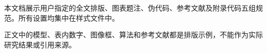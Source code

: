 \documentclass[UTF8,a4paper,12pt,fontset=none]{ctexart}
\begin{document}
\makecoverheading
\begin{papersummary}
本文档展示用户指定的全文排版、图表题注、伪代码、参考文献及附录代码五组规范。所有设置均集中在样式文件中。

正文中的模型、表内数字、图像框、算法和参考文献都是排版示例，不能作为实际研究结果或引用来源。
\end{papersummary}
\makepapertoc
\startpaper

\end{document}
